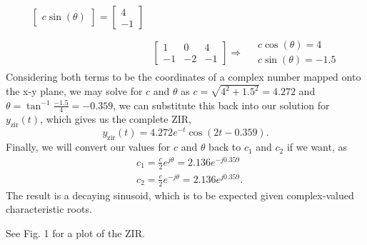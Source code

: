 \documentclass{article}
\begin{document}
\begin{enumerate}[label=\thesubsubsection]
\begin{enumerate}[label=(\alph*), start=2]
\begin{align*}
\begin{bmatrix}
				c\sin{(\theta)}
			\end{bmatrix} = 
			\begin{bmatrix}
				4 \\
				-1
			\end{bmatrix} \\ \\
			&\begin{bmatrix}
				1 & 0 & 4 \\
				-1 & -2 & -1
			\end{bmatrix}
			\Rightarrow \ 
			\begin{matrix}
				&c\cos{(\theta)} = 4 \\
				&c\sin{(\theta)} = -1.5
			\end{matrix}
		\end{align*}
		Considering both terms to be the coordinates of a complex number mapped onto the x-y plane, we may solve for \(c\) and \(\theta\) as \(c = \sqrt{4^2 + 1.5^2} = 4.272\) and \(\theta = \tan^{-1}{\frac{-1.5}{4}} = -0.359\), we can substitute this back into our solution for \(y_{\mathrm{zir}}(t)\), which gives us the complete ZIR, 
		\[
			y_{\mathrm{zir}}(t) = 4.272e^{-t}\cos{(2t - 0.359)}.
		\]
		Finally, we will convert our values for \(c\) and \(\theta\) back to \(c_1\) and \(c_2\) if we want, as 
		\begin{align*}
			&c_1 = \frac{c}{2}e^{j\theta} = 2.136e^{-j0.359} \\
			&c_2 = \frac{c}{2}e^{-j\theta} = 2.136e^{j0.359}.
		\end{align*}
		The result is a decaying sinusoid, which is to be expected given complex-valued characteristic roots.

		See Fig. 1 for a plot of the ZIR.


\end{enumerate}
\end{enumerate}
\end{document}

